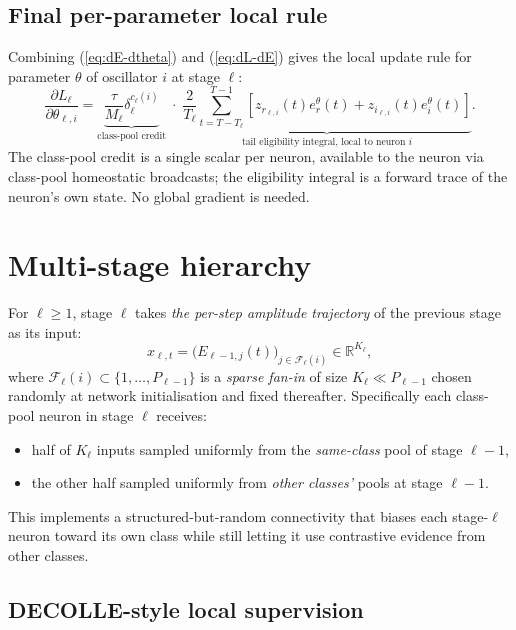 \documentclass[11pt]{article}
\newcommand{\R}{\mathbb{R}}
\newcommand{\zr}{z_r}
\newcommand{\zi}{z_i}
\begin{document}
\subsection{Final per-parameter local rule}

Combining (\ref{eq:dE-dtheta}) and (\ref{eq:dL-dE}) gives the local
update rule for parameter $\theta$ of oscillator $i$ at stage $\ell$:
\begin{equation}
\boxed{\quad
\frac{\partial L_\ell}{\partial \theta_{\ell, i}}
=  \underbrace{\frac{\tau}{M_\ell} \delta_\ell^{c_\ell(i)}}_{\text{class-pool credit}}
\;\cdot\;
\underbrace{\frac{2}{T_\ell}\!\!\sum_{t=T-T_\ell}^{T-1}\!\!
\left[\zr_{\ell, i}(t) e^\theta_r(t) + \zi_{\ell, i}(t) e^\theta_i(t)\right]
}_{\text{tail eligibility integral, local to neuron } i}.
\quad}
\label{eq:final-rule}
\end{equation}
The class-pool credit is a single scalar per neuron, available to the
neuron via class-pool homeostatic broadcasts; the eligibility integral
is a forward trace of the neuron's own state. No global gradient is
needed.

\section{Multi-stage hierarchy}\label{sec:hier}

For $\ell \ge 1$, stage $\ell$ takes \emph{the per-step amplitude
trajectory} of the previous stage as its input:
\begin{equation}
x_{\ell, t} = \big(E_{\ell-1, j}(t)\big)_{j \in \mathcal{F}_\ell(i)}
\in \R^{K_\ell},
\end{equation}
where $\mathcal{F}_\ell(i) \subset \{1, \ldots, P_{\ell-1}\}$ is a
\emph{sparse fan-in} of size $K_\ell \ll P_{\ell - 1}$ chosen randomly
at network initialisation and fixed thereafter. Specifically each
class-pool neuron in stage $\ell$ receives:
\begin{itemize}[itemsep=2pt]
\item half of $K_\ell$ inputs sampled uniformly from the
\emph{same-class} pool of stage $\ell - 1$,
\item the other half sampled uniformly from \emph{other classes'}
pools at stage $\ell - 1$.
\end{itemize}
This implements a structured-but-random connectivity that biases each
stage-$\ell$ neuron toward its own class while still letting it use
contrastive evidence from other classes.

\subsection{DECOLLE-style local supervision}
\end{document}

